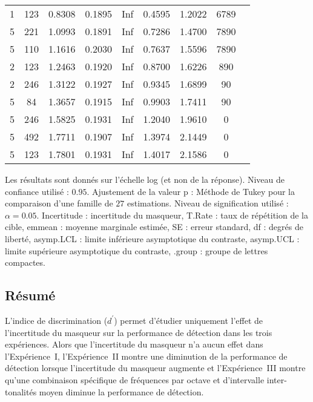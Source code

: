 \begin{table}[!t]
\begin{tabular}{|l|*{8}{c|}}
1 & 123 & 0.8308 & 0.1895 & Inf & 0.4595 & 1.2022 & 6789 \\ 
5 & 221 & 1.0993 & 0.1891 & Inf & 0.7286 & 1.4700 & 7890 \\ 
5 & 110 & 1.1616 & 0.2030 & Inf & 0.7637 & 1.5596 & 7890 \\ 
2 & 123 & 1.2463 & 0.1920 & Inf & 0.8700 & 1.6226 & 890 \\ 
2 & 246 & 1.3122 & 0.1927 & Inf & 0.9345 & 1.6899 & 90 \\ 
5 & 84 & 1.3657 & 0.1915 & Inf & 0.9903 & 1.7411 & 90 \\ 
5 & 246 & 1.5825 & 0.1931 & Inf & 1.2040 & 1.9610 & 0 \\ 
5 & 492 & 1.7711 & 0.1907 & Inf & 1.3974 & 2.1449 & 0 \\ 
5 & 123 & 1.7801 & 0.1931 & Inf & 1.4017 & 2.1586 & 0 \\ 
\hline
\end{tabular}
\smallskip
\begin{flushleft}
Les résultats sont donnés sur l'échelle log (et non de la réponse). 
Niveau de confiance utilisé : $0.95$. 
Ajustement de la valeur p : Méthode de Tukey pour la comparaison d'une famille de $27$ estimations. 
Niveau de signification utilisé : $\alpha = 0.05$. 
Incertitude : incertitude du masqueur, T.Rate : taux de répétition de la cible, emmean : moyenne marginale estimée, SE : erreur standard, df : degrés de liberté, asymp.LCL : limite inférieure asymptotique du contraste, asymp.UCL : limite supérieure asymptotique du contraste, .group : groupe de lettres compactes.
\end{flushleft}
\end{table}

\subsection{Résumé}
\label{chapitre4resultatsresume}

L'indice de discrimination ($d^\prime$) permet d'étudier uniquement l'effet de l'incertitude du masqueur sur la performance de détection dans les trois expériences. 
Alors que l'incertitude du masqueur n'a aucun effet dans l'Expérience~I, l'Expérience~II montre une diminution de la performance de détection lorsque l'incertitude du masqueur augmente et l'Expérience~III montre qu'une combinaison spécifique de fréquences par octave et d'intervalle inter-tonalités moyen diminue la performance de détection.

